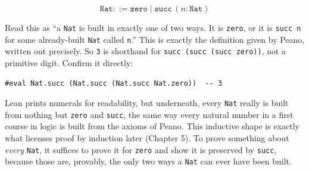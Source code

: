 \[
\mathtt{Nat} ::= \mathtt{zero} \mid \mathtt{succ}\,(n : \mathtt{Nat})
\]

Read this as ``a \texttt{Nat} is built in exactly one of two ways. It is \texttt{zero}, or it is \texttt{succ n} for some already-built \texttt{Nat} called \texttt{n}.'' This is exactly the definition given by Peano, written out precisely. So \texttt{3} is shorthand for \texttt{succ (succ (succ zero))}, not a primitive digit. Confirm it directly:

\begin{lstlisting}
#eval Nat.succ (Nat.succ (Nat.succ Nat.zero))  -- 3
\end{lstlisting}

Lean prints numerals for readability, but underneath, every \texttt{Nat} really is built from nothing but \texttt{zero} and \texttt{succ}, the same way every natural number in a first course in logic is built from the axioms of Peano. This inductive shape is exactly what licenses proof by induction later (Chapter 5). To prove something about \emph{every} \texttt{Nat}, it suffices to prove it for \texttt{zero} and show it is preserved by \texttt{succ}, because those are, provably, the only two ways a \texttt{Nat} can ever have been built.

\begin{quote}
\end{quote}

